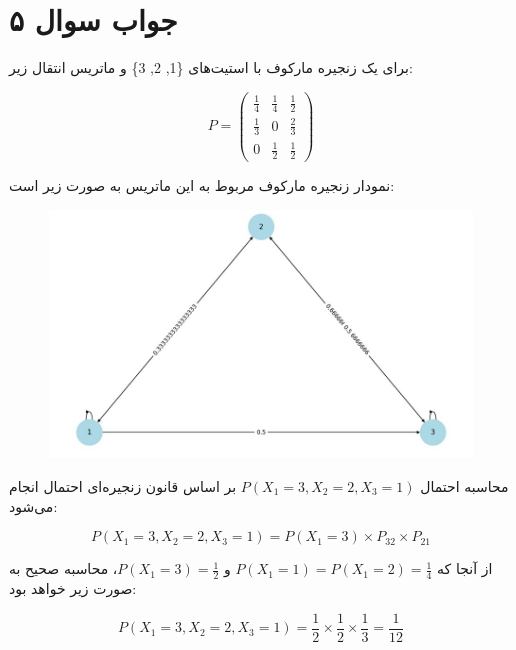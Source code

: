 \section*{جواب سوال ۵}

برای یک زنجیره مارکوف با استیت‌های \{1, 2, 3\} و ماتریس انتقال زیر:

\[
P = \begin{pmatrix}
	\frac{1}{4} & \frac{1}{4} & \frac{1}{2} \\
	\frac{1}{3} & 0 & \frac{2}{3} \\
	0 & \frac{1}{2} & \frac{1}{2}
\end{pmatrix}
\]

نمودار زنجیره مارکوف مربوط به این ماتریس به صورت زیر است:

\begin{figure}[H]
	\centering
	\includegraphics{pic1.jpg}
	\label{fig:label4}
\end{figure}

محاسبه احتمال \(P(X_1 = 3, X_2 = 2, X_3 = 1)\) بر اساس قانون زنجیره‌ای احتمال انجام می‌شود:

\[
P(X_1 = 3, X_2 = 2, X_3 = 1) = P(X_1 = 3) \times P_{32} \times P_{21}
\]

از آنجا که \(P(X_1 = 1) = P(X_1 = 2) = \frac{1}{4}\) و \(P(X_1 = 3) = \frac{1}{2}\)، محاسبه صحیح به صورت زیر خواهد بود:

\[
P(X_1 = 3, X_2 = 2, X_3 = 1) = \frac{1}{2} \times \frac{1}{2} \times \frac{1}{3} = \frac{1}{12}
\]
